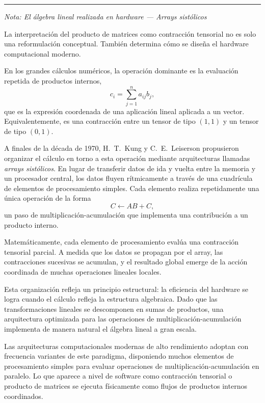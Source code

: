 \bigskip
\hrule
\medskip

\textit{Nota: El álgebra lineal realizada en hardware --- Arrays sistólicos
\cite{kung}}

\medskip

La interpretación del producto de matrices como contracción tensorial no es
solo una reformulación conceptual.
También determina cómo se diseña el hardware computacional moderno.

\medskip

En los grandes cálculos numéricos, la operación dominante es la evaluación
repetida de productos internos,
\[
c_i = \sum_{j=1}^{n} a_{ij} b_j,
\]
que es la expresión coordenada de una aplicación lineal aplicada a un vector.
Equivalentemente, es una contracción entre un tensor de tipo $(1,1)$ y un
tensor de tipo $(0,1)$.

\medskip

A finales de la década de 1970, H.~T.~Kung y C.~E.~Leiserson propusieron
organizar el cálculo en torno a esta operación mediante arquitecturas llamadas
\emph{arrays sistólicos}.
En lugar de transferir datos de ida y vuelta entre la memoria y un procesador
central, los datos fluyen rítmicamente a través de una cuadrícula de elementos
de procesamiento simples.
Cada elemento realiza repetidamente una única operación de la forma
\[
C \leftarrow A B + C,
\]
un paso de multiplicación-acumulación que implementa una contribución a un
producto interno.

\medskip

Matemáticamente, cada elemento de procesamiento evalúa una contracción tensorial
parcial.
A medida que los datos se propagan por el array, las contracciones sucesivas
se acumulan, y el resultado global emerge de la acción coordinada de muchas
operaciones lineales locales.

\medskip

Esta organización refleja un principio estructural: la eficiencia del hardware
se logra cuando el cálculo refleja la estructura algebraica.
Dado que las transformaciones lineales se descomponen en sumas de productos,
una arquitectura optimizada para las operaciones de multiplicación-acumulación
implementa de manera natural el álgebra lineal a gran escala.

\medskip

Las arquitecturas computacionales modernas de alto rendimiento adoptan con
frecuencia variantes de este paradigma, disponiendo muchos elementos de
procesamiento simples para evaluar operaciones de multiplicación-acumulación
en paralelo.
Lo que aparece a nivel de software como contracción tensorial o producto de
matrices se ejecuta físicamente como flujos de productos internos coordinados.

